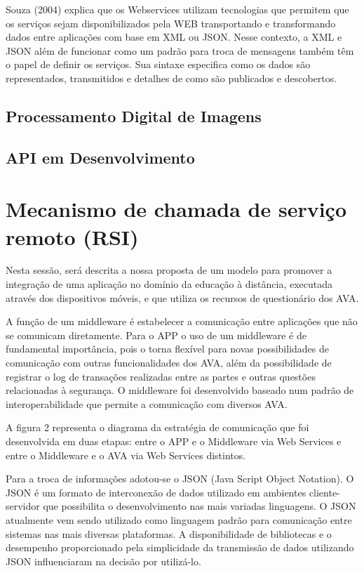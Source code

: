 \documentclass[12pt]{article}
\begin{document}
Souza (2004) explica que os Webservices utilizam tecnologias que permitem que
os serviços sejam disponibilizados pela WEB transportando e transformando dados
entre aplicações com base em XML ou JSON. Nesse contexto, a XML e JSON além de
funcionar como um padrão para troca de mensagens também têm o papel de definir os
serviços. Sua sintaxe especifica como os dados são representados, transmitidos e
detalhes de como são publicados e descobertos.

\subsection{Processamento Digital de Imagens}


\subsection{API em Desenvolvimento}


\section{Mecanismo de chamada de serviço remoto (RSI)}

Nesta sessão, será descrita a nossa proposta de um modelo para promover a integração
de uma aplicação no domínio da educação à distância, executada através dos
dispositivos móveis, e que utiliza os recursos de questionário dos AVA.

A função de um middleware é estabelecer a comunicação entre aplicações que
não se comunicam diretamente. Para o APP o uso de um middleware é de fundamental
importância, pois o torna flexível para novas possibilidades de comunicação com outras
funcionalidades dos AVA, além da possibilidade de registrar o log de transações
realizadas entre as partes e outras questões relacionadas à segurança. O middleware foi 
desenvolvido baseado num padrão de interoperabilidade que permite a comunicação
com diversos AVA. 

A figura 2 representa o diagrama da estratégia de comunicação que
foi desenvolvida em duas etapas: entre o APP e o Middleware via Web Services e entre
o Middleware e o AVA via Web Services distintos.

Para a troca de informações adotou-se o JSON (Java Script Object Notation). O
JSON é um formato de interconexão de dados utilizado em ambientes cliente-servidor
que possibilita o desenvolvimento nas mais variadas linguagens. O JSON atualmente
vem sendo utilizado como linguagem padrão para comunicação entre sistemas nas mais
diversas plataformas. A disponibilidade de bibliotecas e o desempenho proporcionado
pela simplicidade da transmissão de dados utilizando JSON influenciaram na decisão
por utilizá-lo.
\end{document}
